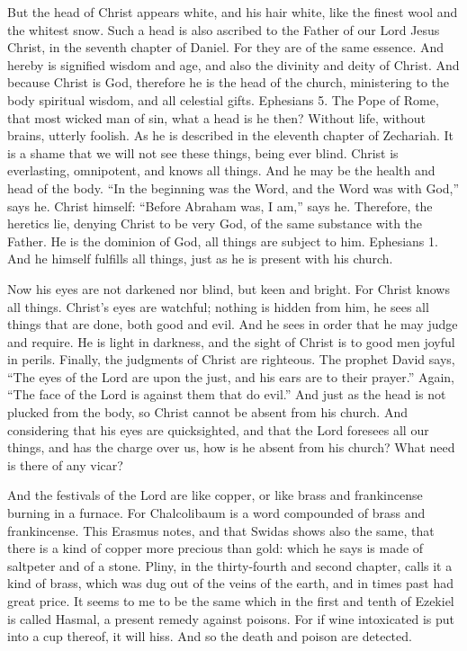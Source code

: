 But the head of Christ appears white, and his hair white, like the finest wool and the whitest snow. Such a head is also ascribed to the Father of our Lord Jesus Christ, in the seventh chapter of Daniel. For they are of the same essence. And hereby is signified wisdom and age, and also the divinity and deity of Christ. And because Christ is God, therefore he is the head of the church, ministering to the body spiritual wisdom, and all celestial gifts. Ephesians 5. The Pope of Rome, that most wicked man of sin, what a head is he then? Without life, without brains, utterly foolish. As he is described in the eleventh chapter of Zechariah. It is a shame that we will not see these things, being ever blind. Christ is everlasting, omnipotent, and knows all things. And he may be the health and head of the body. “In the beginning was the Word, and the Word was with God,” says he. Christ himself: “Before Abraham was, I am,” says he. Therefore, the heretics lie, denying Christ to be very God, of the same substance with the Father. He is the dominion of God, all things are subject to him. Ephesians 1. And he himself fulfills all things, just as he is present with his church.

Now his eyes are not darkened nor blind, but keen and bright. For Christ knows all things. Christ’s eyes are watchful; nothing is hidden from him, he sees all things that are done, both good and evil. And he sees in order that he may judge and require. He is light in darkness, and the sight of Christ is to good men joyful in perils. Finally, the judgments of Christ are righteous. The prophet David says, “The eyes of the Lord are upon the just, and his ears are to their prayer.” Again, “The face of the Lord is against them that do evil.” And just as the head is not plucked from the body, so Christ cannot be absent from his church. And considering that his eyes are quicksighted, and that the Lord foresees all our things, and has the charge over us, how is he absent from his church? What need is there of any vicar?

And the festivals of the Lord are like copper, or like brass and frankincense burning in a furnace. For Chalcolibaum is a word compounded of brass and frankincense. This Erasmus notes, and that Swidas shows also the same, that there is a kind of copper more precious than gold: which he says is made of saltpeter and of a stone. Pliny, in the thirty-fourth and second chapter, calls it a kind of brass, which was dug out of the veins of the earth, and in times past had great price. It seems to me to be the same which in the first and tenth of Ezekiel is called Hasmal, a present remedy against poisons. For if wine intoxicated is put into a cup thereof, it will hiss. And so the death and poison are detected.

